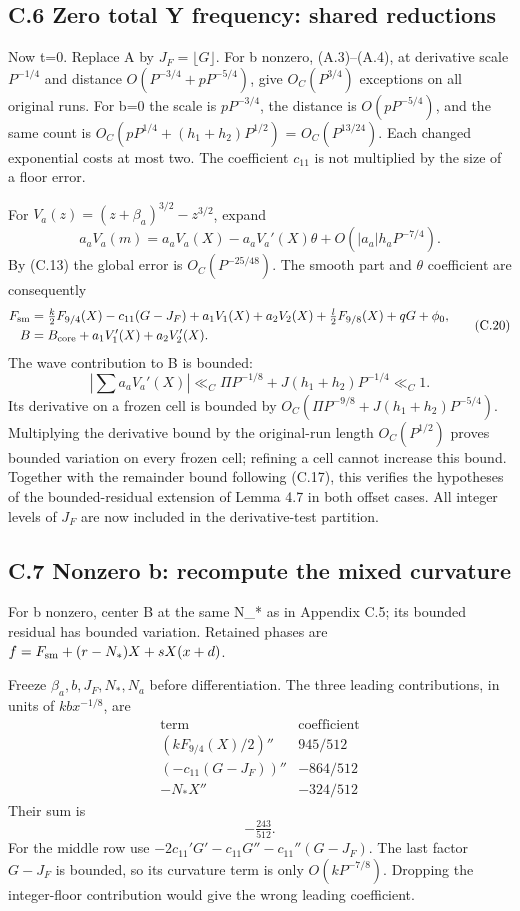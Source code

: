 \documentclass[11pt,a4paper]{article}
\begin{document}
\subsection{C.6 Zero total Y frequency: shared
reductions}\label{c.6-zero-total-y-frequency-shared-reductions}

Now t=0. Replace A by \(J_F=\lfloor G\rfloor\). For b nonzero,
(A.3)--(A.4), at derivative scale \(P^{-1/4}\) and distance
\(O(P^{-3/4}+pP^{-5/4})\), give \(O_C(P^{3/4})\) exceptions on all
original runs. For b=0 the scale is \(pP^{-3/4}\), the distance is
\(O(pP^{-5/4})\), and the same count is
\(O_C(pP^{1/4}+(h_1+h_2)P^{1/2})\) = \(O_C(P^{13/24})\). Each changed
exponential costs at most two. The coefficient \(c_{11}\) is not
multiplied by the size of a floor error.

For \(V_a(z)=(z+\beta_a)^{3/2}-z^{3/2}\), expand \[
a_aV_a(m)=a_aV_a(X)-a_aV_a'(X)\theta
+O(|a_a|h_aP^{-7/4}).
\] By (C.13) the global error is \(O_C(P^{-25/48})\). The smooth part
and \(\theta\) coefficient are consequently \[
\begin{split}
F_{\rm sm}&=\tfrac k2F_{9/4}(X)-c_{11}(G-J_F)
+a_1V_1(X)+a_2V_2(X)+\tfrac l2F_{9/8}(X)+qG+\phi_0,\\
B&=B_{\rm core}+a_1V_1'(X)+a_2V_2'(X).
\end{split}\tag{C.20}
\] The wave contribution to B is bounded: \[
\left|\sum a_aV_a'(X)\right|
\ll_C \Pi P^{-1/8}+J(h_1+h_2)P^{-1/4}\ll_C1.
\] Its derivative on a frozen cell is bounded by
\(O_C(\Pi P^{-9/8}+J(h_1+h_2)P^{-5/4})\). Multiplying the derivative
bound by the original-run length \(O_C(P^{1/2})\) proves bounded
variation on every frozen cell; refining a cell cannot increase this
bound. Together with the remainder bound following (C.17), this verifies
the hypotheses of the bounded-residual extension of Lemma 4.7 in both
offset cases. All integer levels of \(J_F\) are now included in the
derivative-test partition.

\subsection{C.7 Nonzero b: recompute the mixed
curvature}\label{c.7-nonzero-b-recompute-the-mixed-curvature}

For b nonzero, center B at the same N\_* as in Appendix C.5; its bounded
residual has bounded variation. Retained phases are
\(f=F_{\rm sm}+(r-N_*)X+sX(x+d)\).

Freeze \(\beta_a,b,J_F,N_*,N_a\) before differentiation. The three
leading contributions, in units of \(kb x^{-1/8}\), are \[
\begin{array}{c|c}
\text{term} & \text{coefficient}\\ \hline
(kF_{9/4}(X)/2)'' & 945/512\\
(-c_{11}(G-J_F))'' & -864/512\\
-N_*X'' & -324/512
\end{array}
\] Their sum is \[
-\tfrac{243}{512}. \tag{C.21}
\] For the middle row use \(-2c_{11}'G'-c_{11}G''-c_{11}''(G-J_F)\). The
last factor \(G-J_F\) is bounded, so its curvature term is only
\(O(kP^{-7/8})\). Dropping the integer-floor contribution would give the
wrong leading coefficient.
\end{document}
